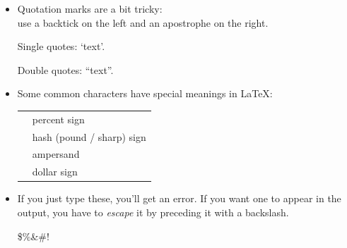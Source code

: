 \documentclass{beamer}
\begin{document}
\begin{frame}[fragile]{\insertsubsection{}}
\small
\begin{itemize}
\item Quotation marks are a bit tricky:\\
use a backtick \keystroke{\`{}} on the left and an apostrophe \keystroke{\'{}} on the right.
\begin{exampletwouptiny}
Single quotes: `text'.

Double quotes: ``text''.
\end{exampletwouptiny}

\item Some common characters have special meanings in \LaTeX:\\[1ex]
\begin{tabular}{cl}
\keystrokebftt{\%} & percent sign              \\
\keystrokebftt{\#} & hash (pound / sharp) sign \\
\keystrokebftt{\&} & ampersand                 \\
\keystrokebftt{\$} & dollar sign               \\
\end{tabular}
\item If you just type these, you'll get an error. If you want one to appear in
the output, you have to \emph{escape} it by preceding it with a backslash.
\begin{exampletwoup}
\$\%\&\#!
\end{exampletwoup}
\end{itemize}
\end{frame}


\begin{frame}[fragile]{\insertsubsection{}}
\end{frame}
\end{document}
